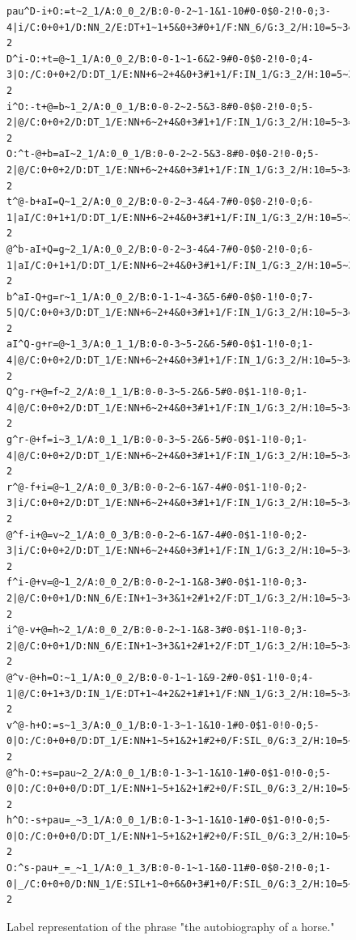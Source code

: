 \begin{figure}[h]
\begin{lstlisting}[basicstyle=\tiny,frame=single]
pau^D-i+O:=t~2_1/A:0_0_2/B:0-0-2~1-1&1-10#0-0$0-2!0-0;3-4|i/C:0+0+1/D:NN_2/E:DT+1~1+5&0+3#0+1/F:NN_6/G:3_2/H:10=5~3=1|F/I:0_0/J:10+16-2
D^i-O:+t=@~1_1/A:0_0_2/B:0-0-1~1-6&2-9#0-0$0-2!0-0;4-3|O:/C:0+0+2/D:DT_1/E:NN+6~2+4&0+3#1+1/F:IN_1/G:3_2/H:10=5~3=1|F/I:0_0/J:10+16-2
i^O:-t+@=b~1_2/A:0_0_1/B:0-0-2~2-5&3-8#0-0$0-2!0-0;5-2|@/C:0+0+2/D:DT_1/E:NN+6~2+4&0+3#1+1/F:IN_1/G:3_2/H:10=5~3=1|F/I:0_0/J:10+16-2
O:^t-@+b=aI~2_1/A:0_0_1/B:0-0-2~2-5&3-8#0-0$0-2!0-0;5-2|@/C:0+0+2/D:DT_1/E:NN+6~2+4&0+3#1+1/F:IN_1/G:3_2/H:10=5~3=1|F/I:0_0/J:10+16-2
t^@-b+aI=Q~1_2/A:0_0_2/B:0-0-2~3-4&4-7#0-0$0-2!0-0;6-1|aI/C:0+1+1/D:DT_1/E:NN+6~2+4&0+3#1+1/F:IN_1/G:3_2/H:10=5~3=1|F/I:0_0/J:10+16-2
@^b-aI+Q=g~2_1/A:0_0_2/B:0-0-2~3-4&4-7#0-0$0-2!0-0;6-1|aI/C:0+1+1/D:DT_1/E:NN+6~2+4&0+3#1+1/F:IN_1/G:3_2/H:10=5~3=1|F/I:0_0/J:10+16-2
b^aI-Q+g=r~1_1/A:0_0_2/B:0-1-1~4-3&5-6#0-0$0-1!0-0;7-5|Q/C:0+0+3/D:DT_1/E:NN+6~2+4&0+3#1+1/F:IN_1/G:3_2/H:10=5~3=1|F/I:0_0/J:10+16-2
aI^Q-g+r=@~1_3/A:0_1_1/B:0-0-3~5-2&6-5#0-0$1-1!0-0;1-4|@/C:0+0+2/D:DT_1/E:NN+6~2+4&0+3#1+1/F:IN_1/G:3_2/H:10=5~3=1|F/I:0_0/J:10+16-2
Q^g-r+@=f~2_2/A:0_1_1/B:0-0-3~5-2&6-5#0-0$1-1!0-0;1-4|@/C:0+0+2/D:DT_1/E:NN+6~2+4&0+3#1+1/F:IN_1/G:3_2/H:10=5~3=1|F/I:0_0/J:10+16-2
g^r-@+f=i~3_1/A:0_1_1/B:0-0-3~5-2&6-5#0-0$1-1!0-0;1-4|@/C:0+0+2/D:DT_1/E:NN+6~2+4&0+3#1+1/F:IN_1/G:3_2/H:10=5~3=1|F/I:0_0/J:10+16-2
r^@-f+i=@~1_2/A:0_0_3/B:0-0-2~6-1&7-4#0-0$1-1!0-0;2-3|i/C:0+0+2/D:DT_1/E:NN+6~2+4&0+3#1+1/F:IN_1/G:3_2/H:10=5~3=1|F/I:0_0/J:10+16-2
@^f-i+@=v~2_1/A:0_0_3/B:0-0-2~6-1&7-4#0-0$1-1!0-0;2-3|i/C:0+0+2/D:DT_1/E:NN+6~2+4&0+3#1+1/F:IN_1/G:3_2/H:10=5~3=1|F/I:0_0/J:10+16-2
f^i-@+v=@~1_2/A:0_0_2/B:0-0-2~1-1&8-3#0-0$1-1!0-0;3-2|@/C:0+0+1/D:NN_6/E:IN+1~3+3&1+2#1+2/F:DT_1/G:3_2/H:10=5~3=1|F/I:0_0/J:10+16-2
i^@-v+@=h~2_1/A:0_0_2/B:0-0-2~1-1&8-3#0-0$1-1!0-0;3-2|@/C:0+0+1/D:NN_6/E:IN+1~3+3&1+2#1+2/F:DT_1/G:3_2/H:10=5~3=1|F/I:0_0/J:10+16-2
@^v-@+h=O:~1_1/A:0_0_2/B:0-0-1~1-1&9-2#0-0$1-1!0-0;4-1|@/C:0+1+3/D:IN_1/E:DT+1~4+2&2+1#1+1/F:NN_1/G:3_2/H:10=5~3=1|F/I:0_0/J:10+16-2
v^@-h+O:=s~1_3/A:0_0_1/B:0-1-3~1-1&10-1#0-0$1-0!0-0;5-0|O:/C:0+0+0/D:DT_1/E:NN+1~5+1&2+1#2+0/F:SIL_0/G:3_2/H:10=5~3=1|F/I:0_0/J:10+16-2
@^h-O:+s=pau~2_2/A:0_0_1/B:0-1-3~1-1&10-1#0-0$1-0!0-0;5-0|O:/C:0+0+0/D:DT_1/E:NN+1~5+1&2+1#2+0/F:SIL_0/G:3_2/H:10=5~3=1|F/I:0_0/J:10+16-2
h^O:-s+pau=_~3_1/A:0_0_1/B:0-1-3~1-1&10-1#0-0$1-0!0-0;5-0|O:/C:0+0+0/D:DT_1/E:NN+1~5+1&2+1#2+0/F:SIL_0/G:3_2/H:10=5~3=1|F/I:0_0/J:10+16-2
O:^s-pau+_=_~1_1/A:0_1_3/B:0-0-1~1-1&0-11#0-0$0-2!0-0;1-0|_/C:0+0+0/D:NN_1/E:SIL+1~0+6&0+3#1+0/F:SIL_0/G:3_2/H:10=5~3=1|F/I:0_0/J:10+16-2
\end{lstlisting}
    \label{fig:sentence-lab}
    \caption{Label representation of the phrase "the autobiography of a horse."}
\end{figure}

